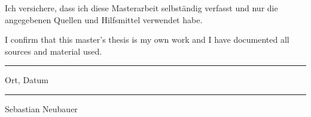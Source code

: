 \newpage
\vspace*{16cm}
\noindent
Ich versichere, dass ich diese Masterarbeit selbständig verfasst und nur die angegebenen Quellen und Hilfsmittel verwendet habe.

\vspace{1cm}
\noindent
I confirm that this master's thesis is my own work and I have documented all sources and material used.

\vspace*{2cm}
\parbox{5cm}{\centering \hrule
\strut \centering\footnotesize Ort, Datum} \hfill\parbox{5cm}{\hrule
\strut \centering\footnotesize Sebastian Neubauer}
